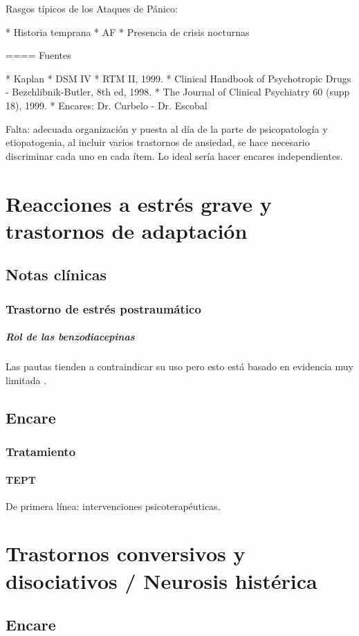 \documentclass{scrbook}
\begin{document}
Rasgos típicos de los Ataques de Pánico:

* Historia temprana
* AF
* Presencia de crisis nocturnas

==== Fuentes

* Kaplan
* DSM IV
* RTM II, 1999.
* Clinical Handbook of Psychotropic Drugs - Bezchlibnik-Butler, 8th ed, 1998.
* The Journal of Clinical Psychiatry 60 (supp 18), 1999.
* Encares: Dr. Curbelo - Dr. Escobal

Falta: adecuada organización y puesta al día de la parte de psicopatología y etiopatogenia, al incluir varios trastornos de ansiedad, se hace necesario discriminar cada uno en cada ítem. Lo ideal sería hacer encares independientes.
\chapter{Reacciones a estrés grave y trastornos de adaptación}
\section*{Notas clínicas}
\subsection*{Trastorno de estrés postraumático}
\paragraph{Rol de las benzodiacepinas}
Las pautas tienden a contraindicar su uso pero esto está basado en evidencia muy limitada \cite{starcevic2017no}.
\section*{Encare}
\subsection*{Tratamiento}
\subsubsection*{TEPT}
De primera línea: intervenciones psicoterapéuticas.
\printbibliography[]
\chapter{Trastornos conversivos y disociativos / Neurosis histérica}
\section*{Encare}
\end{document}
